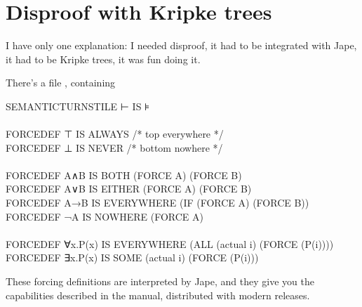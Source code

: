 \chapter{Disproof with Kripke trees} 
\label{chap:Kripke}

I have only one explanation: I needed disproof, it had to be integrated with Jape, it had to be Kripke trees, it was fun doing it.

There's a file , containing
\begin{japeish}
SEMANTICTURNSTILE ⊢ IS ⊧ \\
\\
FORCEDEF ⊤   IS ALWAYS /* top everywhere */ \\
FORCEDEF ⊥   IS NEVER  /* bottom nowhere */ \\
\\
FORCEDEF A∧B IS BOTH (FORCE A) (FORCE B) \\
FORCEDEF A∨B IS EITHER (FORCE A) (FORCE B) \\
FORCEDEF A→B IS EVERYWHERE (IF (FORCE A) (FORCE B)) \\
FORCEDEF ¬A  IS NOWHERE (FORCE A) \\
\\
FORCEDEF ∀x.P(x) IS EVERYWHERE (ALL (actual i) (FORCE (P(i)))) \\
FORCEDEF ∃x.P(x) IS SOME (actual i) (FORCE (P(i)))
\end{japeish}
These forcing definitions are interpreted by Jape, and they give you the capabilities described in the  manual, distributed with modern releases.
